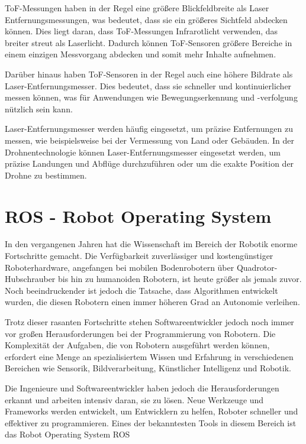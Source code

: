 ToF-Messungen haben in der Regel eine größere Blickfeldbreite als Laser Entfernungsmessungen, was bedeutet, dass sie ein größeres Sichtfeld abdecken können. Dies liegt daran, dass ToF-Messungen Infrarotlicht verwenden, das breiter streut als Laserlicht. Dadurch können ToF-Sensoren größere Bereiche in einem einzigen Messvorgang abdecken und somit mehr Inhalte aufnehmen.

Darüber hinaus haben ToF-Sensoren in der Regel auch eine höhere Bildrate als Laser-Entfernungsmesser. Dies bedeutet, dass sie schneller und kontinuierlicher messen können, was für Anwendungen wie Bewegungserkennung und -verfolgung nützlich sein kann.

Laser-Entfernungsmesser werden häufig eingesetzt, um präzise Entfernungen zu messen, wie beispielsweise bei der Vermessung von Land oder Gebäuden. In der Drohnentechnologie können Laser-Entfernungsmesser eingesetzt werden, um präzise Landungen und Abflüge durchzuführen oder um die exakte Position der Drohne zu bestimmen.




\section{ROS - Robot Operating System} \label{ros:section}
In den vergangenen Jahren hat die Wissenschaft im Bereich der Robotik enorme Fortschritte gemacht. Die Verfügbarkeit zuverlässiger und kostengünstiger Roboterhardware, angefangen bei mobilen Bodenrobotern über Quadrotor-Hubschrauber bis hin zu humanoiden Robotern, ist heute größer als jemals zuvor. Noch beeindruckender ist jedoch die Tatsache, dass Algorithmen entwickelt wurden, die diesen Robotern einen immer höheren Grad an Autonomie verleihen.

Trotz dieser rasanten Fortschritte stehen Softwareentwickler jedoch noch immer vor großen Herausforderungen bei der Programmierung von Robotern. Die Komplexität der Aufgaben, die von Robotern ausgeführt werden können, erfordert eine Menge an spezialisiertem Wissen und Erfahrung in verschiedenen Bereichen wie Sensorik, Bildverarbeitung, Künstlicher Intelligenz und Robotik.

Die Ingenieure und Softwareentwickler haben jedoch die Herausforderungen erkannt und arbeiten intensiv daran, sie zu lösen. Neue Werkzeuge und Frameworks werden entwickelt, um Entwicklern zu helfen, Roboter schneller und effektiver zu programmieren. Eines der bekanntesten Tools in diesem Bereich ist das Robot Operating System \ac{ROS}

